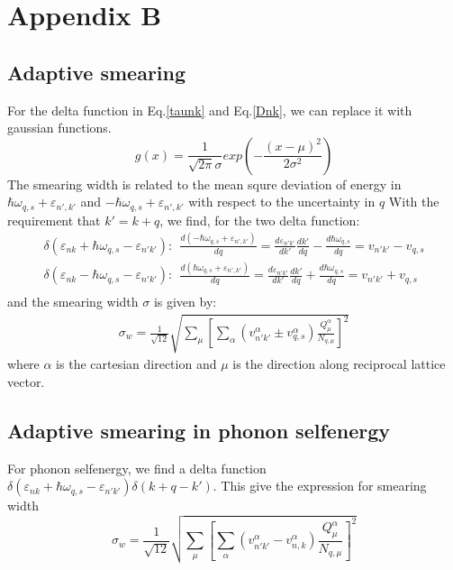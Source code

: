 \documentclass{article}
\begin{document}
\section*{Appendix B}
\subsection*{Adaptive smearing}
For the delta function in Eq.\ref{taunk} and Eq.\ref{Dnk}, we can replace it with 
gaussian functions. 
\begin{equation}
    g(x) = \frac{1}{\sqrt{2\pi}\sigma} exp \left( -\frac{(x-\mu)^2}{2\sigma^2} \right)
\end{equation}
The smearing width is related to the mean squre deviation of 
energy in $\hbar \omega_{q,s} + \varepsilon_{n',k'}$  and $- \hbar \omega_{q,s} + \varepsilon_{n',k'}$
with respect to the uncertainty in $q$
With the requirement that $k' = k + q$, we find, for the two delta function:
\begin{gather}
    \delta(\varepsilon_{nk} + \hbar\omega_{q,s} - \varepsilon_{n'k'}) :\ \ \frac{d (- \hbar \omega_{q,s} + \varepsilon_{n',k'})}{d q} = 
        \frac{d \varepsilon_{n'k'} }{d k'} \frac{dk'}{d q} - \frac{d\hbar \omega_{q,s}}{dq} = v_{n'k'} - v_{q,s} \\
    \delta(\varepsilon_{nk} - \hbar\omega_{q,s} - \varepsilon_{n'k'}) :\ \ \frac{d (\hbar \omega_{q,s} + \varepsilon_{n',k'})}{d q} =
        \frac{d \varepsilon_{n'k'} }{d k'} \frac{dk'}{d q} + \frac{d\hbar \omega_{q,s}}{dq} = v_{n'k'} + v_{q,s} \\
\end{gather}
and the smearing width $\sigma$ is given by:
\begin{gather}
    \sigma_w = \frac{1}{\sqrt{12}}
     \sqrt{\sum_\mu\left[ \sum_{\alpha} (v_{n'k'}^{\alpha} \pm v_{q,s}^{\alpha}) \frac{Q_{\mu}^{\alpha}}{N_{q,\mu}} \right]^2}
\end{gather}
where $\alpha$ is the cartesian direction and $\mu$ is the direction along reciprocal lattice vector.
\subsection*{Adaptive smearing in phonon selfenergy}
For phonon selfenergy, we find a delta function
$\delta(\varepsilon_{nk} + \hbar\omega_{q,s} - \varepsilon_{n'k'}) \delta(k+q-k')$. 
This give the expression for smearing width
\begin{equation}
    \sigma_w = \frac{1}{\sqrt{12}}
     \sqrt{\sum_\mu\left[ \sum_{\alpha} (v_{n'k'}^{\alpha} - v_{n,k}^{\alpha}) \frac{Q_{\mu}^{\alpha}}{N_{q,\mu}} \right]^2}
\end{equation}
\end{document}
